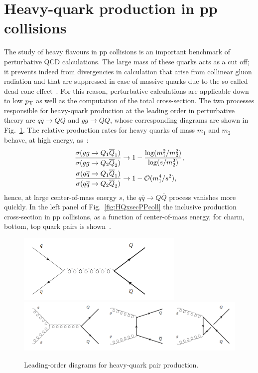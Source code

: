 \section{Heavy-quark production in pp collisions}
\label{sec:HFpp}
The study of heavy flavours in pp collisions is an 
important benchmark of perturbative QCD calculations. 
The large mass of these quarks acts as a cut off; it prevents 
indeed from divergencies in calculation that arise
from collinear gluon radiation and that are suppressed 
in case of massive quarks due to the
so-called dead-cone effect~\cite{Dokshitzer:1991fd}. 
For this reason, perturbative calculations are applicable down to low $p_{\rm T}$ 
as well as the computation of the total cross-section. 
The two processes responsible for heavy-quark production 
at the leading order in perturbative theory are 
$q \overline{q} \rightarrow Q \overline{Q}$ and $gg \rightarrow Q \overline{Q}$, 
whose corresponding diagrams are
shown in Fig.~\ref{fig:LOdiagrams}. The relative production 
rates for heavy quarks of mass 
$m_1$ and $m_2$ behave, at high energy, as~\cite{Mangano:1997ri}:
\begin{equation}
\begin{aligned}
\frac{\sigma (gg \rightarrow Q_1 \overline{Q}_1)}{\sigma (gg \rightarrow Q_2 \overline{Q}_2)} & \rightarrow 1 - \frac{{\rm log}(m_1^2/m_2^2)}{{\rm log}(s/m_2^2)}, \\
\frac{\sigma (q \overline{q} \rightarrow Q_1 \overline{Q}_1)}{\sigma (q \overline{q} \rightarrow Q_2 \overline{Q}_2)} & \rightarrow 1 - \mathcal{O} (m_1^4/s^2),
\end{aligned}
\end{equation}
hence, at large center-of-mass energy $s$, the 
$q \overline{q} \rightarrow Q \overline{Q}$ process
vanishes more quickly. In the left panel of Fig.~\ref{fig:HQxsecPPcoll}
 the inclusive production cross-section in pp collisions,
as a function of center-of-mass energy, for charm, bottom, 
top quark pairs is shown~\cite{Mangano:1997ri}.
\begin{figure}[!ht]
  \centering
  \includegraphics[width=8cm]{FigCap2/Feymann1.png}
  \includegraphics[width=15cm]{FigCap2/Feymann2.png}
  \caption{Leading-order diagrams for heavy-quark pair production.}
  \label{fig:LOdiagrams}
\end{figure}
